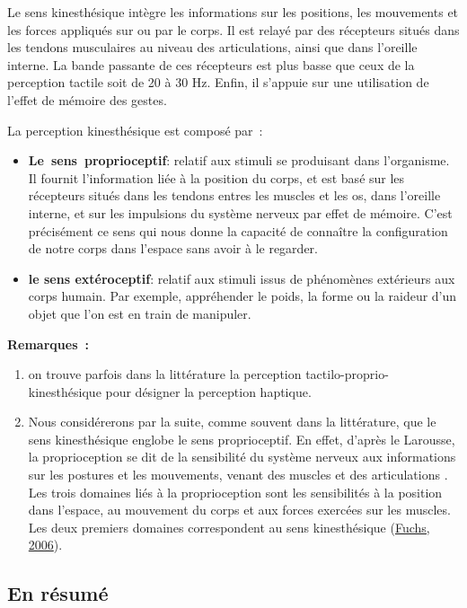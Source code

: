 \documentclass[
]{book}
\providecommand{\tightlist}{%
  \setlength{\itemsep}{0pt}\setlength{\parskip}{0pt}}
\begin{document}
Le sens kinesthésique intègre les informations sur les positions, les
mouvements et les forces appliqués sur ou par le corps. Il est relayé par des
récepteurs situés dans les tendons musculaires au niveau des articulations,
ainsi que dans l'oreille interne. La bande passante de ces récepteurs est
plus basse que ceux de la perception tactile soit de 20 à 30 Hz. Enfin, il
s'appuie sur une utilisation de l'effet de mémoire des gestes.

La perception kinesthésique est composé par~:

\begin{itemize}
\tightlist
\item
  \textbf{Le~sens~proprioceptif}: relatif aux
  stimuli se produisant dans l'organisme. Il fournit l'information liée à la
  position du corps, et est basé sur les récepteurs situés dans les tendons
  entres les muscles et les os, dans l'oreille interne, et sur les impulsions
  du système nerveux par effet de mémoire. C'est précisément ce sens qui nous
  donne la capacité de connaître la configuration de notre corps dans
  l'espace sans avoir à le regarder.
\item
  \textbf{le sens extéroceptif}: relatif aux stimuli
  issus de phénomènes extérieurs aux corps humain. Par exemple, appréhender
  le poids, la forme ou la raideur d'un objet que l'on est en train de
  manipuler.
\end{itemize}

\textbf{Remarques~:}

\begin{enumerate}
\def\labelenumi{\arabic{enumi}.}
\tightlist
\item
  on trouve parfois dans la littérature la
  perception tactilo-proprio-kinesthésique pour désigner la perception
  haptique.
\item
  Nous considérerons par la suite, comme souvent
  dans la littérature, que le sens kinesthésique englobe le sens
  proprioceptif. En effet, d'après le Larousse, la proprioception se dit de
  la sensibilité du système nerveux aux informations sur les postures et les
  mouvements, venant des muscles et des articulations . Les trois domaines
  liés à la proprioception sont les sensibilités à la position dans l'espace,
  au mouvement du corps et aux forces exercées sur les muscles. Les deux
  premiers domaines correspondent au sens kinesthésique (\protect\hyperlink{ref-fuchs2006traite}{Fuchs, 2006}).
\end{enumerate}

\hypertarget{en-ruxe9sumuxe9}{%
\subsection{En résumé}\label{en-ruxe9sumuxe9}}
\end{document}
